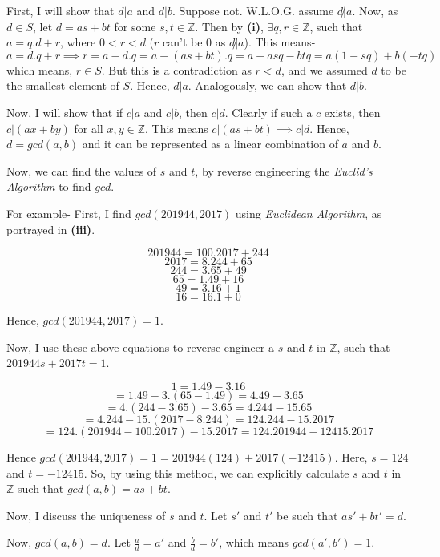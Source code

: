\documentclass{article}
\begin{document}
\begin{enumerate}[(i)]
{{\smallskip

First, I will show that $d|a$ and $d|b$. Suppose not. W.L.O.G. assume $d \not| a$. Now, as $d \in S$, let $d = as + bt$ for some $s,t \in \mathbb{Z}$. Then by \textbf{(i)}, $\exists q,r \in \mathbb{Z}$, such that $a = q.d + r$, where $0 < r < d$ ($r$ can't be $0$ as $d \not| a$). This means-
$$a = d.q + r \implies r = a - d.q = a - (as + bt).q = a - asq - btq = a(1-sq) + b(-tq)$$
which means, $r \in S$. But this is a contradiction as $r < d$, and we assumed $d$ to be the smallest element of $S$. Hence, $d | a$. Analogously, we can show that $d | b$.

\smallskip

Now, I will show that if $c | a$ and $c | b$, then $c | d$. Clearly if such a $c$ exists, then $c | (ax + by)$ for all $x,y \in \mathbb{Z}$. This means $c | (as + bt) \implies c | d$. Hence, $d = gcd(a,b)$ and it can be represented as a linear combination of $a$ and $b$.

Now, we can find the values of $s$ and $t$, by reverse engineering the \textit{Euclid's Algorithm} to find $gcd$. 

\smallskip

For example- First, I find $gcd(201944,2017)$ using \textit{Euclidean Algorithm}, as portrayed in \textbf{(iii)}.

$$201944 = 100.2017 + 244$$
$$2017 = 8.244 + 65$$
$$244 = 3.65 + 49$$
$$65 = 1.49 + 16$$
$$49 = 3.16 + 1$$
$$16 = 16.1 + 0$$

Hence, $gcd(201944,2017) = 1$.

\bigskip

Now, I use these above equations to reverse engineer a $s$ and $t$ in $\mathbb{Z}$, such that $201944s + 2017t = 1$.

$$1 = 1.49 - 3.16$$
$$= 1.49 - 3.(65-1.49) = 4.49 - 3.65$$
$$= 4.(244-3.65) - 3.65 = 4.244 - 15.65$$
$$= 4.244 - 15.(2017 - 8.244) = 124.244 - 15.2017$$
$$= 124.(201944-100.2017) - 15.2017 = 124.201944 - 12415.2017$$

Hence $gcd(201944,2017) = 1 = 201944(124) + 2017(-12415)$. Here, $s = 124$ and $t = -12415$. So, by using this method, we can explicitly calculate $s$ and $t$ in $\mathbb{Z}$ such that $gcd(a,b) = as + bt$.

\smallskip

Now, I discuss the uniqueness of $s$ and $t$. Let $s'$ and $t'$ be such that $as' + bt' = d$.

\smallskip

Now, $gcd(a,b) = d$. Let $\frac{a}{d} = a'$ and $\frac{b}{d} = b'$, which means $gcd(a',b') = 1$.

}}
\end{enumerate}
\end{document}
